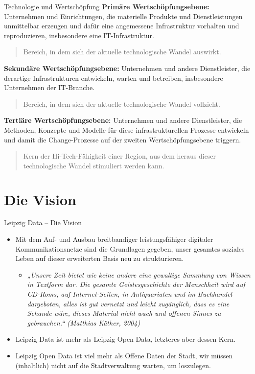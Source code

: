 \documentclass{beamer}
\begin{document}
\begin{frame}{Technologie und Wertschöpfung}{}\small
\textbf{Primäre Wertschöpfungsebene:} Unternehmen und Einrichtungen, die
materielle Produkte und Dienstleistungen unmittelbar erzeugen und dafür eine
angemessene Infrastruktur vorhalten und reproduzieren, insbesondere eine
IT-Infrastruktur.
\begin{quote}
  Bereich, in dem sich der aktuelle technologische Wandel auswirkt.
\end{quote}
\textbf{Sekundäre Wertschöpfungsebene:} Unternehmen und andere Dienstleister,
die derartige Infrastrukturen entwickeln, warten und betreiben, insbesondere
Unternehmen der IT-Branche.
\begin{quote}
  Bereich, in dem sich der aktuelle technologische Wandel vollzieht.
\end{quote}
\textbf{Tertiäre Wertschöpfungsebene:} Unternehmen und andere Dienstleister,
die Methoden, Konzepte und Modelle für diese infrastrukturellen Prozesse
entwickeln und damit die Change-Prozesse auf der zweiten Wertschöpfungsebene
triggern.
\begin{quote}
  Kern der Hi-Tech-Fähigkeit einer Region, aus dem heraus dieser technologische
  Wandel stimuliert werden kann.
\end{quote}
\end{frame}

\section{Die Vision}
\begin{frame}{Leipzig Data – Die Vision}{}
  \begin{itemize}
  \item Mit dem Auf- und Ausbau breitbandiger leistungsfähiger digitaler
    Kommunikationsnetze sind die Grundlagen gegeben, unser gesamtes soziales
    Leben auf dieser erweiterten Basis neu zu strukturieren.
    \begin{itemize}
    \item[]\footnotesize\it „Unsere Zeit bietet wie keine andere eine gewaltige
      Sammlung von Wissen in Textform dar. Die gesamte Geistesgeschichte der
      Menschheit wird auf CD-Roms, auf Internet-Seiten, in Antiquariaten und im
      Buchhandel dargeboten, alles ist gut vernetzt und leicht zugänglich, dass
      es eine Schande wäre, dieses Material nicht wach und offenen Sinnes zu
      gebrauchen.“ (Matthias Käther, 2004)
    \end{itemize}
  \item {Leipzig Data} ist mehr als {Leipzig Open Data}, letzteres
    aber dessen Kern.
  \item {Leipzig Open Data} ist viel mehr als {Offene Daten der
    Stadt}, wir müssen (inhaltlich) nicht auf die Stadtverwaltung warten, um
    loszulegen.
  \end{itemize}
\end{frame}
\end{document}

